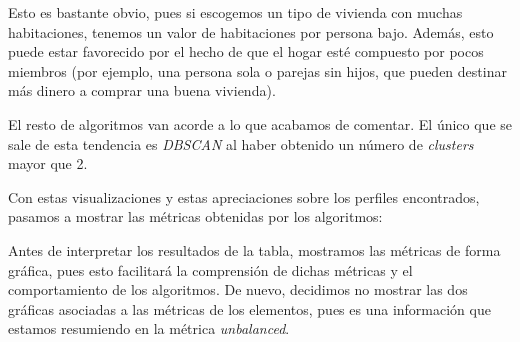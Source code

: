 \documentclass[11pt]{article}
\begin{document}
Esto es bastante obvio, pues si escogemos un tipo de vivienda con muchas habitaciones, tenemos un valor de habitaciones por persona bajo. Además, esto puede estar favorecido por el hecho de que el hogar esté compuesto por pocos miembros (por ejemplo, una persona sola o parejas sin hijos, que pueden destinar más dinero a comprar una buena vivienda).

El resto de algoritmos van acorde a lo que acabamos de comentar. El único que se sale de esta tendencia es \emph{DBSCAN} al haber obtenido un número de \emph{clusters} mayor que 2.


Con estas visualizaciones y estas apreciaciones sobre los perfiles encontrados, pasamos a mostrar las métricas obtenidas por los algoritmos:

\begin{table}[H]
\begin{center}
\end{center}
\caption{Resultados de los algoritmos según distintas métricas de evaluación}
    \label{resultados_stcase01:tabla}
\end{table}

Antes de interpretar los resultados de la tabla, mostramos las métricas de forma gráfica, pues esto facilitará la comprensión de dichas métricas y el comportamiento de los algoritmos. De nuevo, decidimos no mostrar las dos gráficas asociadas a las métricas de los elementos, pues es una información que estamos resumiendo en la métrica \emph{unbalanced}.
\end{document}
